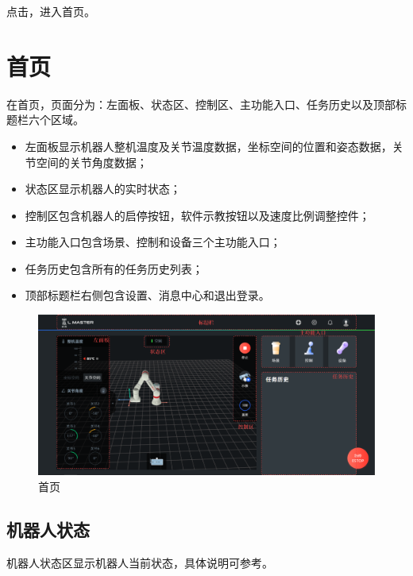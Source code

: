 点击，进入\LM 首页。

\clearpage

\section{首页}

在\LM 首页，页面分为：左面板、状态区、控制区、主功能入口、任务历史以及顶部标题栏六个区域。

\begin{itemize}
\item 左面板显示机器人整机温度及关节温度数据，坐标空间的位置和姿态数据，关节空间的关节角度数据；
\item 状态区显示机器人的实时状态；
\item 控制区包含机器人的启停按钮，软件示教按钮以及速度比例调整控件；
\item 主功能入口包含场景、控制和设备三个主功能入口；
\item 任务历史包含所有的任务历史列表；
\item 顶部标题栏右侧包含设置、消息中心和退出登录。
\end{itemize}

\begin{figure}[ht]
	\centering
	\includegraphics[width=\textwidth]{shots/home.pdf}
	\caption{\LM 首页}
	\label{fig:LM首页}
\end{figure}

\clearpage

\subsection{机器人状态}

机器人状态区显示机器人当前状态，具体说明可参考。

